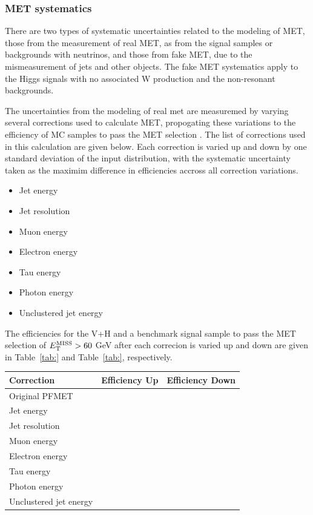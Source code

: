 \subsubsection{MET systematics}\label{sec:metsyst}

There are two types of systematic uncertainties related to the modeling of MET, those from the measurement of real MET, as from the signal samples or backgrounds with neutrinos, and those from fake MET, due to the mismeasurement of jets and other objects. The fake MET systematics apply to the Higgs signals with no associated W production and the non-resonant backgrounds. 

The uncertainties from the modeling of real met are measuremed by varying several corrections used to calculate MET, propogating these variations to the efficiency of MC samples to pass the MET selection \cite{mettwiki}. The list of corrections used in this calculation are given below. Each correction is varied up and down by one standard deviation of the input distribution, with the systematic uncertainty taken as the maximim difference in efficiencies accross all correction variations.

\begin{itemize}
\item Jet energy
\item Jet resolution
\item Muon energy
\item Electron energy
\item Tau energy
\item Photon energy
\item Unclustered jet energy
\end{itemize}

The efficiencies for the V+H and a benchmark signal sample to pass the MET selection of $E_{\rm{T}}^{\rm{MISS}}>60$ GeV after each correcion is varied up and down are given in Table~\ref{tab:} and Table~\ref{tab:}, respectively. 

\begin{table}[htbH]
\begin{center}
\label{tab:yields}
\begin{tabular}{ l | c | c }
\hline
\hline
Correction & Efficiency Up & Efficiency Down \\
\hline
Original PFMET & & \\
\hline
Jet energy & & \\
\hline
Jet resolution & & \\
\hline
Muon energy & & \\
\hline
Electron energy & & \\
\hline
Tau energy & & \\
\hline
Photon energy & & \\
\hline
Unclustered jet energy & & \\
\hline
\hline
\end{tabular}
\end{center}
\end{table}


